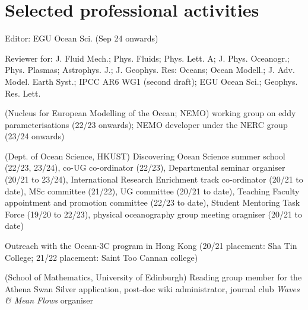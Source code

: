 \documentclass[letterpaper]{article}
\renewenvironment{itemize}{
  \begin{list}{}{
    \setlength{\leftmargin}{1.5em}
  }
}{
  \end{list}
}
\begin{document}
\section*{Selected professional activities}
\begin{itemize}

\item[--] Editor: EGU Ocean Sci. (Sep 24 onwards)

\item[--] Reviewer for: J. Fluid Mech.; Phys. Fluids; Phys. Lett. A; J. Phys.
Oceanogr.; Phys. Plasmas; Astrophys. J.; J. Geophys. Res: Oceans; Ocean Modell.;
J. Adv. Model. Earth Syst.; IPCC AR6 WG1 (second draft); EGU Ocean Sci.; Geophys. Res. Lett.

\item[--] (Nucleus for European Modelling of the Ocean; NEMO) working group on
eddy parameterisations (22/23 onwards); NEMO developer under the NERC group
(23/24 onwards)

\item[--] (Dept. of Ocean Science, HKUST) Discovering Ocean Science summer
school (22/23, 23/24), co-UG co-ordinator (22/23), Departmental seminar
organiser (20/21 to 23/24), International Research Enrichment track co-ordinator
(20/21 to date), MSc committee (21/22), UG committee (20/21 to date), Teaching
Faculty appointment and promotion committee (22/23 to date), Student Mentoring
Task Force (19/20 to 22/23), physical oceanography group meeting oragniser
(20/21 to date)

\item[--] Outreach with the Ocean-3C program in Hong Kong (20/21 placement: Sha
Tin College; 21/22 placement: Saint Too Cannan college)

\item[--] (School of Mathematics, University of Edinburgh) Reading group member
for the Athena Swan Silver application, post-doc wiki administrator, journal
club \textit{Waves \& Mean Flows} organiser 

\end{itemize}


\end{document}
